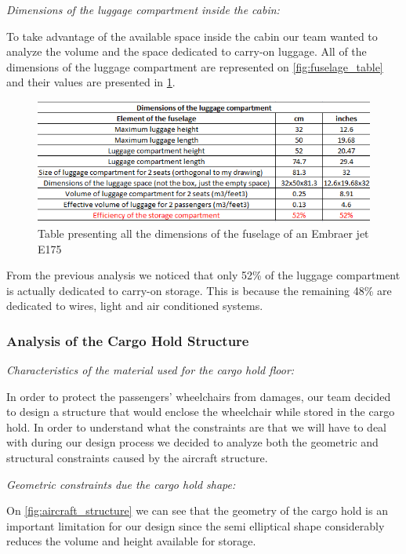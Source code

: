 \noindent\emph{Dimensions of the luggage compartment inside the cabin:}

To take advantage of the available space inside the cabin our team wanted to analyze the volume and the space dedicated to carry-on luggage. All of the dimensions of the luggage compartment are represented on \ref{fig:fuselage_table} and their values are presented in \ref{fig:luggage_compartment_table}.\\

\begin{figure}[h]
\centering
\includegraphics[width=12cm]{images/luggage_compartment_table.png}
\caption{Table presenting all the dimensions of the fuselage of an Embraer jet E175}
\label{fig:luggage_compartment_table}
\end{figure}

From the previous analysis we noticed that only 52\% of the luggage compartment is actually dedicated to carry-on storage. This is because the remaining 48\% are dedicated to wires, light and air conditioned systems.

\subsubsection{Analysis of the Cargo Hold Structure}

\emph{Characteristics of the material used for the cargo hold floor:}

In order to protect the passengers' wheelchairs from damages, our team decided to design a structure that would enclose the wheelchair while stored in the cargo hold. In order to understand what the constraints are that we will have to deal with during our design process we decided to analyze both the geometric and structural constraints caused by the aircraft structure.

\noindent\emph{Geometric constraints due the cargo hold shape:}

On \ref{fig:aircraft_structure} we can see that the geometry of the cargo hold is an important limitation for our design since the semi elliptical shape considerably reduces the volume and height available for storage.\\


